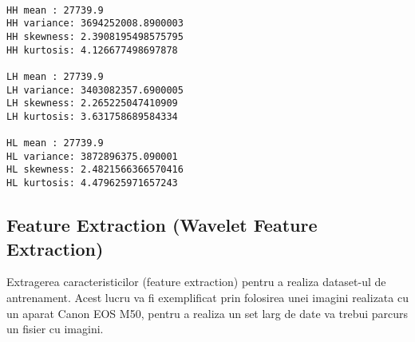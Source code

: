 \documentclass[11pt]{article}
\begin{document}
    \begin{center}
    \end{center}
    { \hspace*{\fill} \\}
    
    \begin{Verbatim}[commandchars=\\\{\}]
HH mean : 27739.9
HH variance: 3694252008.8900003
HH skewness: 2.3908195498575795
HH kurtosis: 4.126677498697878

LH mean : 27739.9
LH variance: 3403082357.6900005
LH skewness: 2.265225047410909
LH kurtosis: 3.631758689584334

HL mean : 27739.9
HL variance: 3872896375.090001
HL skewness: 2.4821566366570416
HL kurtosis: 4.479625971657243

    \end{Verbatim}

    \hypertarget{feature-extraction-wavelet-feature-extraction}{%
\subsection{Feature Extraction (Wavelet Feature
Extraction)}\label{feature-extraction-wavelet-feature-extraction}}

Extragerea caracteristicilor (feature extraction) pentru a realiza
dataset-ul de antrenament. Acest lucru va fi exemplificat prin folosirea
unei imagini realizata cu un aparat Canon EOS M50, pentru a realiza un
set larg de date va trebui parcurs un fisier cu imagini.
\end{document}
